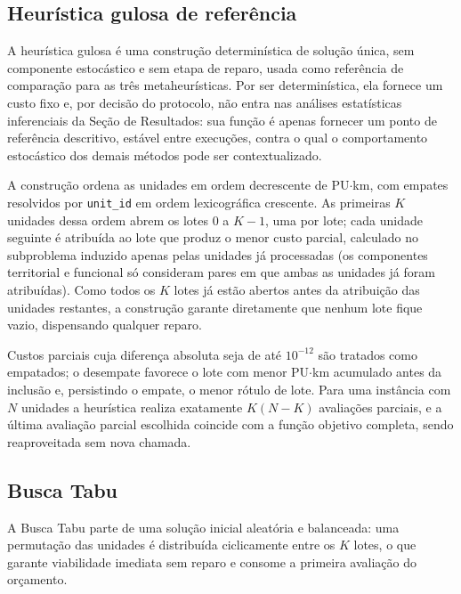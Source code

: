 \documentclass[12pt,a4paper]{article}
\begin{document}
\subsection{Heurística gulosa de referência}
\label{subsec:gulosa}

A heurística gulosa é uma construção determinística de solução única, sem
componente estocástico e sem etapa de reparo, usada como referência de
comparação para as três metaheurísticas. Por ser determinística, ela fornece um custo fixo e, por decisão do protocolo, não entra nas
análises estatísticas inferenciais da Seção de Resultados: sua função é apenas fornecer um ponto de
referência descritivo, estável entre execuções, contra o qual o
comportamento estocástico dos demais métodos pode ser contextualizado.

A construção ordena as unidades em ordem decrescente de PU$\cdot$km, com
empates resolvidos por \texttt{unit\_id} em ordem lexicográfica crescente.
As primeiras $K$ unidades dessa ordem abrem os lotes $0$ a $K-1$, uma por
lote; cada unidade seguinte é atribuída ao lote que produz o menor custo
parcial, calculado no subproblema induzido apenas pelas unidades já
processadas (os componentes territorial e funcional só consideram pares em
que ambas as unidades já foram atribuídas). Como todos os $K$ lotes já estão
abertos antes da atribuição das unidades restantes, a construção garante
diretamente que nenhum lote fique vazio, dispensando qualquer reparo.

Custos parciais cuja diferença absoluta seja de até $10^{-12}$ são tratados
como empatados; o desempate favorece o lote com menor PU$\cdot$km acumulado
antes da inclusão e, persistindo o empate, o menor rótulo de lote. Para uma
instância com $N$ unidades a heurística realiza exatamente $K(N-K)$
avaliações parciais, e a última avaliação parcial escolhida coincide com a
função objetivo completa, sendo reaproveitada sem nova chamada.

\subsection{Busca Tabu}
\label{subsec:tabu}

A Busca Tabu \cite{glover1989,glover1990} parte de uma solução inicial
aleatória e balanceada: uma permutação das unidades é distribuída
ciclicamente entre os $K$ lotes, o que garante viabilidade imediata sem
reparo e consome a primeira avaliação do orçamento.
\end{document}
